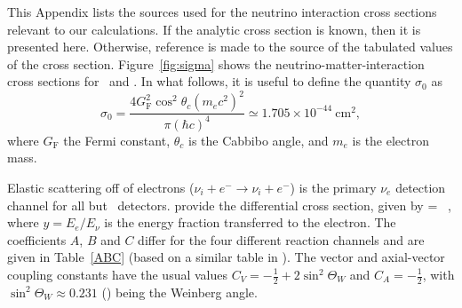 This Appendix lists the sources used for the neutrino
interaction cross sections relevant to our calculations. 
If the analytic cross section is known, then it is presented here.
Otherwise, reference is made to the source of the tabulated values of
the cross section.  
Figure~\ref{fig:sigma} shows the neutrino-matter-interaction
cross sections for \nue\ and \anue.
In what follows, it is useful to
define the quantity $\sigma_0$ as
\begin{equation}
\sigma_0 = \frac{4G_\textrm{F}^2\cos^2{\theta_c}(m_ec^2)^2}{\pi(\hbar c)^4}
\simeq 1.705 \times 10^{-44}~\textrm{cm}^2,
\end{equation}
where $G_\textrm{F}$ the Fermi constant, 
 $\theta_c$ is the Cabbibo angle, and $m_e$ is the electron mass. 




Elastic scattering off of electrons ($\nu_i + e^- \rightarrow \nu_i +
e^-$)  is the primary $\nu_e$ detection channel for all but
\ detectors. \cite{tomasetal2003} provide the
differential cross section, given by
%
\beq   \label{el}
  = 
   ~,
\eeq         
%
where $y=E_e/E_\nu$ is the energy fraction transferred to the electron.  The
coefficients $A$, $B$ and $C$ differ for the four different reaction
channels and are given in Table~\ref{ABC} (based on a similar table in
\citealt{tomasetal2003}). The vector and axial-vector
coupling constants have the usual values $C_V
=-\frac{1}{2}+2\sin^2\Theta_W$ and $C_A=-\frac{1}{2}$, with
$\sin^2\Theta_W \approx 0.231$ (\citealt{oliveetal2014}) being the Weinberg angle.

